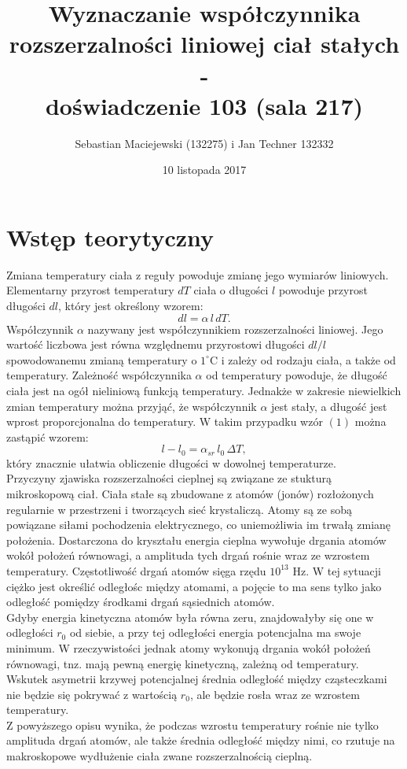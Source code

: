 \documentclass[10pt,a4paper]{article}
\author{Sebastian Maciejewski (132275) i Jan Techner 132332}
\title{Wyznaczanie współczynnika rozszerzalności liniowej ciał stałych - \\ doświadczenie 103 (sala 217)}
\date{10 listopada 2017}
\newcommand{\forceindent}{\leavevmode{\parindent=3em\indent}}
\begin{document}
\maketitle
\section{Wstęp teorytyczny}
\forceindent Zmiana temperatury ciała z reguły powoduje zmianę jego wymiarów liniowych. Elementarny przyrost temperatury $dT$ ciała o długości $l$ powoduje przyrost długości $dl$, który jest określony wzorem: 
\begin{equation}
dl = \alpha \, l \, dT.
\end{equation}
\forceindent Współczynnik $\alpha$ nazywany jest współczynnikiem rozszerzalności liniowej. Jego wartość liczbowa jest równa względnemu przyrostowi długości $dl/l$ spowodowanemu zmianą temperatury o $1^{\circ}$C i zależy od rodzaju ciała, a także od temperatury. Zależność współczynnika $\alpha$ od temperatury powoduje, że długość ciała jest na ogół nieliniową funkcją temperatury. Jednakże w zakresie niewielkich zmian temperatury można przyjąć, że współczynnik $\alpha$ jest stały, a długość jest wprost proporcjonalna do temperatury. W takim przypadku wzór $(1)$ można zastąpić wzorem: 
\begin{equation}
l - l_{0} = \alpha_{sr} \, l_{0} \, \Delta T,
\end{equation}
który znacznie ułatwia obliczenie długości w dowolnej temperaturze. \\ \newline
\forceindent Przyczyny zjawiska rozszerzalności cieplnej są związane ze stukturą mikroskopową ciał. Ciała stałe są zbudowane z atomów (jonów) rozłożonych regularnie w przestrzeni i tworzących sieć krystaliczą. Atomy są ze sobą powiązane siłami pochodzenia elektrycznego, co uniemożliwia im trwałą zmianę położenia. Dostarczona do kryształu energia cieplna wywołuje drgania atomów wokół położeń równowagi, a amplituda tych drgań rośnie wraz ze wzrostem temperatury. Częstotliwość drgań atomów sięga rzędu $10^{13}$ Hz. W tej sytuacji ciężko jest określić odległośc między atomami, a pojęcie to ma sens tylko jako odległość pomiędzy środkami drgań sąsiednich atomów. \\ \newline
\forceindent Gdyby energia kinetyczna atomów była równa zeru, znajdowałyby się one w odległości $r_0$ od siebie, a przy tej odległości energia potencjalna ma swoje minimum. W rzeczywistości jednak atomy wykonują drgania wokół położeń równowagi, tnz. mają pewną energię kinetyczną, zależną od temperatury. Wskutek asymetrii krzywej potencjalnej średnia odległość między cząsteczkami nie będzie się pokrywać z wartością $r_0$, ale będzie rosła wraz ze wzrostem temperatury. \\ \newline
\forceindent Z powyższego opisu wynika, że podczas wzrostu temperatury rośnie nie tylko amplituda drgań atomów, ale także średnia odległość między nimi, co rzutuje na makroskopowe wydłużenie ciała zwane rozszerzalnością cieplną.  
\end{document}
